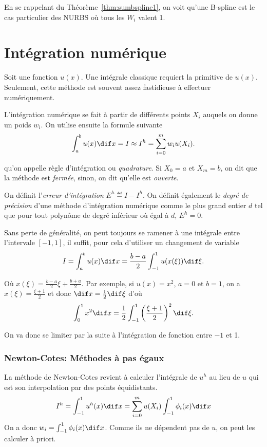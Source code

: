 En se rappelant du Théorème~\ref{thm:sumbspline1}, on voit
qu'une B-spline est le cas particulier des NURBS où tous les $W_i$ valent 1.

\part{Intégration numérique}
Soit une fonction $u(x)$.
Une intégrale classique requiert la primitive de $u(x)$.
Seulement, cette méthode est souvent assez fastidieuse à effectuer
numériquement.

L'intégration numérique se fait à partir de différents points $X_i$ auquels
on donne un poids $w_i$. On utilise ensuite la formule suivante
\[ \int_a^b u(x) \dif x = I \approx I^h = \sum_{i=0}^m w_i u(X_i). \]

qu'on appelle règle d'intégration ou \emph{quadrature}.
Si $X_0 = a$ et $X_m = b$, on dit que la méthode est \emph{fermée},
sinon, on dit qu'elle est \emph{ouverte}.

On définit l'\emph{erreur d'intégration} $E^h \eqdef I - I^h$.
On définit également le \emph{degré de précision} d'une méthode d'intégration
numérique comme le plus grand entier $d$ tel que pour tout polynôme de degré
inférieur où égal à $d$, $E^h = 0$.

Sans perte de généralité, on peut toujours se ramener à une intégrale
entre l'intervale $[-1, 1]$, il suffit, pour cela d'utiliser un changement
de variable
\[ I = \int_a^b u(x) \dif x =
\frac{b-a}{2} \int_{-1}^1 u(x(\xi)) \dif \xi. \]

Où $x(\xi) = \frac{b-a}{2}\xi + \frac{b+a}{2}$.
Par exemple, si $u(x) = x^2$, $a = 0$ et $b = 1$,
on a $x(\xi) = \frac{\xi+1}{2}$ et donc $\dif x = \frac{1}{2}\dif \xi$ d'où
\[ \int_0^1 x^2 \dif x =
\frac{1}{2}\int_{-1}^1 \left(\frac{\xi+1}{2}\right)^2 \dif \xi. \]

On va donc se limiter par la suite à l'intégration de fonction entre $-1$ et 1.

\section{Newton-Cotes: Méthodes à pas égaux}
La méthode de Newton-Cotes revient à calculer l'intégrale de $u^h$ au lieu
de $u$ qui est son interpolation par des points équidistants.
\[ I^h = \int_{-1}^1 u^h(x) \dif x =
\sum_{i=0}^m u(X_i) \int_{-1}^1 \phi_i(x) \dif x \]
On a donc $w_i = \int_{-1}^1 \phi_i(x) \dif x$.
Comme ils ne dépendent pas de $u$, on peut les calculer à priori.

